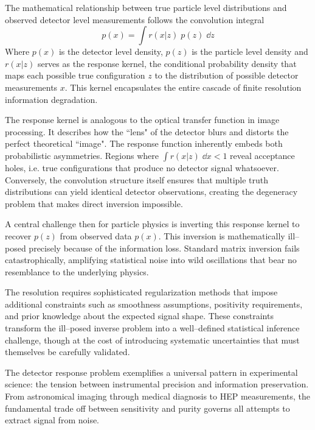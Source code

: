 \begin{definition}
    The mathematical relationship between true particle level distributions and observed detector level measurements follows the convolution integral
    \[
        \label{eq:forward-folding}
        p(x) = \int r(x|z)\;p(z)\; \dd z
    \]
    Where \(p(x)\) is the detector level density, \(p(z)\) is the particle level density and \(r(x|z)\) serves as the response kernel, the conditional probability density that maps each possible true configuration \(z\) to the distribution of possible detector measurements \(x\).
    This kernel encapsulates the entire cascade of finite resolution information degradation.
    
    The response kernel is analogous to the optical transfer function in image processing.
    It describes how the ``lens" of the detector blurs and distorts the perfect theoretical ``image".
    The response function inherently embeds both probabilistic asymmetries.
    Regions where \(\int r(x|z)\;\dd x < 1\) reveal acceptance holes, i.e. true configurations that produce no detector signal whatsoever.
    Conversely, the convolution structure itself ensures that multiple truth distributions can yield identical detector observations, creating the degeneracy problem that makes direct inversion impossible.
    
    A central challenge then for particle physics is inverting this response kernel to recover \(p(z)\) from observed data \(p(x)\).
    This inversion is mathematically ill--posed precisely because of the information loss.
    Standard matrix inversion fails catastrophically, amplifying statistical noise into wild oscillations that bear no resemblance to the underlying physics.
    
    The resolution requires sophisticated regularization methods that impose additional constraints such as smoothness assumptions, positivity requirements, and prior knowledge about the expected signal shape.
    These constraints transform the ill--posed inverse problem into a well--defined statistical inference challenge, though at the cost of introducing systematic uncertainties that must themselves be carefully validated.
    
    The detector response problem exemplifies a universal pattern in experimental science: the tension between instrumental precision and information preservation.
    From astronomical imaging through medical diagnosis to HEP measurements, the fundamental trade off between sensitivity and purity governs all attempts to extract signal from noise.


\end{definition}
